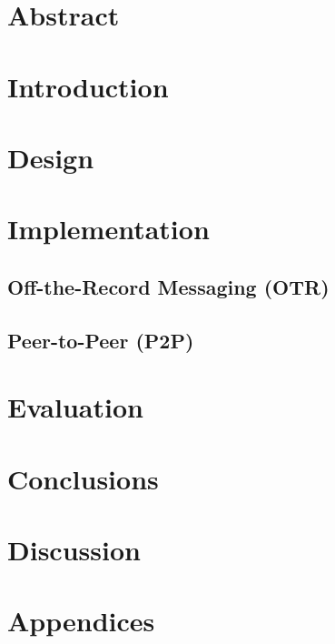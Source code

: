 \documentclass[11pt]{article}
\begin{document}

\clearpage

\onehalfspacing{}

\section*{Abstract}
\label{sec:abstract}

\clearpage

\tableofcontents
\clearpage

\section{Introduction}
\label{sec:intro}


\clearpage
\section{Design}
\label{sec:design}


\clearpage
\section{Implementation}
\label{sec:impl}
\subsection{Off-the-Record Messaging (OTR)}
\subsection{Peer-to-Peer (P2P)}

\clearpage
\section{Evaluation}
\label{sec:eval}


\clearpage
\section{Conclusions}
\label{sec:conclusions}


\clearpage
\section{Discussion}
\label{sec:discussion}


\newpage
\printbibliography[heading=bibintoc]

\newpage
\appendix
\section{Appendices}
\label{sec:appendices}

\end{document}
